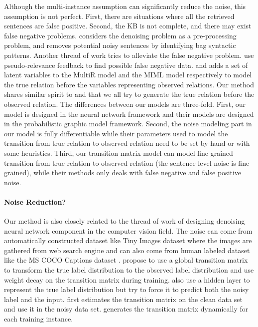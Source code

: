 Although the multi-instance assumption can significantly reduce the noise, this assumption is not perfect. First, there are situations where all the retrieved sentences are false positive. Second, the KB is not complete, and there may exist false negative problems. \cite{takamatsu2012reducing} considers the denoising problem as a pre-processing problem, and removes potential noisy sentences by identifying bag syntactic patterns.  Another thread of work tries to alleviate the false negative problem. \cite{xu2013filling} use pseudo-relevance feedback to find possible false negative data. \cite{ritter2013modeling} and \cite{min2013distant} adds a set of latent variables to the MultiR model \cite{hoffmann2011knowledge} and the MIML model \cite{surdeanu2012multi} respectively to model the true relation before the variables representing observed relations. Our method shares similar spirit to \cite{ritter2013modeling} and \cite{min2013distant} that we all try to generate the true relation before the observed relation. The differences between our models are three-fold. First, our model is designed in the neural network framework and their models are designed in the probabilistic graphic model framework. Second, the noise modeling part in our model is fully differentiable while their parameters used to model the transition from true relation to observed relation need to be set by hand or with some heuristics. Third, our transition matrix model can model fine grained transition from true relation to observed relation (the sentence level noise is fine grained), while their methods only deals with false negative and false positive noise.


\paragraph{Noise Reduction?} Our method is also closely related to the thread of work of designing denoising neural network component in the computer vision field. The noise can come from automatically constructed dataset like Tiny Images dataset \cite{torralba200880} where the images are gathered from web search engine and can also come from human labeled dataset \cite{misra2016seeing} like the MS COCO Captions dataset \cite{chen2015microsoft}. \cite{sukhbaatar2014training} propose to use a global transition matrix to transform the true label distribution to the observed label distribution and use weight decay on the transition matrix during training. \cite{reed2014training} also use a hidden layer to represent the true label distribution but try to force it to predict both the noisy label and the input. \cite{chen2015webly,xiao2015learning} first estimates the transition matrix on the clean data set and use it in the noisy data set. \cite{misra2016seeing} generates the transition matrix dynamically for each training instance.

